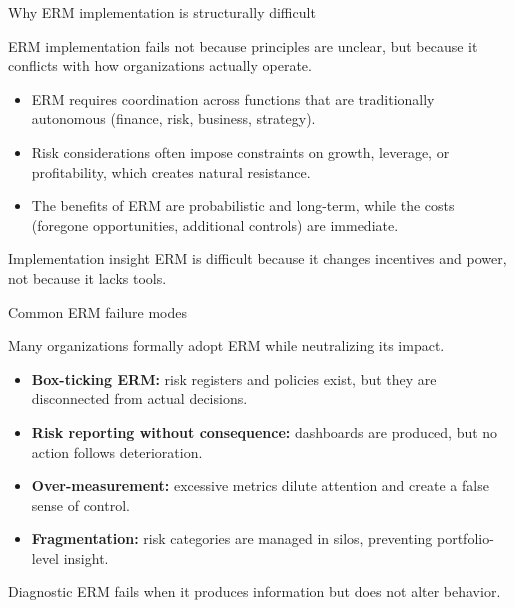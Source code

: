 \documentclass[aspectratio=169, 10pt]{beamer} %
\begin{document}
\begin{frame}{}

\centering
\color{blue} 

\end{frame}
\begin{frame}{Why ERM implementation is structurally difficult}

ERM implementation fails not because principles are unclear, but because
it conflicts with how organizations actually operate.

\medskip

\begin{itemize}
  \item[$\bullet$] ERM requires coordination across functions that are
  traditionally autonomous (finance, risk, business, strategy).

  \item[$\bullet$] Risk considerations often impose constraints on growth,
  leverage, or profitability, which creates natural resistance.

  \item[$\bullet$] The benefits of ERM are probabilistic and long-term,
  while the costs (foregone opportunities, additional controls) are immediate.
\end{itemize}

\begin{block}{Implementation insight}
ERM is difficult because it changes incentives and power, not because it
lacks tools.
\end{block}

\end{frame}

\begin{frame}{Common ERM failure modes}

Many organizations formally adopt ERM while neutralizing its impact.

\medskip

\begin{itemize}
  \item[$\bullet$] \textbf{Box-ticking ERM:} risk registers and policies exist,
  but they are disconnected from actual decisions.

  \item[$\bullet$] \textbf{Risk reporting without consequence:} dashboards are
  produced, but no action follows deterioration.

  \item[$\bullet$] \textbf{Over-measurement:} excessive metrics dilute attention
  and create a false sense of control.

  \item[$\bullet$] \textbf{Fragmentation:} risk categories are managed in silos,
  preventing portfolio-level insight.
\end{itemize}

\begin{block}{Diagnostic}
ERM fails when it produces information but does not alter behavior.
\end{block}

\end{frame}
\end{document}
